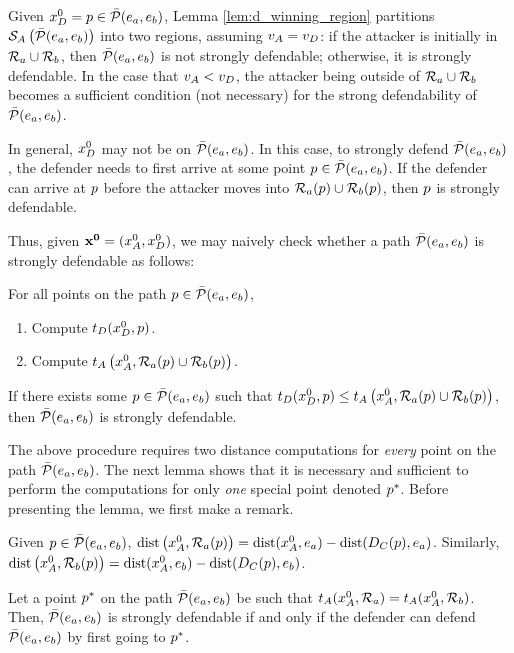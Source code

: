 Given $x_D^0=p\in\bar{\mathcal{P}}(e_a,e_b)$, Lemma \ref{lem:d_winning_region} partitions $\mathcal{S}_A\left(\bar{\mathcal{P}}(e_a,e_b)\right)$ into two regions, assuming $v_A=v_D$: if the attacker is initially in $\mathcal{R}_a \cup \mathcal{R}_b$, then $\bar{\mathcal{P}}(e_a,e_b)$ is not strongly defendable; otherwise, it is strongly defendable. In the case that $v_A<v_D$, the attacker being outside of $\mathcal{R}_a \cup \mathcal{R}_b$ becomes a sufficient condition (not necessary) for the strong defendability of $\bar{\mathcal{P}}(e_a,e_b)$.

In general, $x_D^0$ may not be on $\bar{\mathcal{P}}(e_a,e_b)$. In this case, to strongly defend $\bar{\mathcal{P}}(e_a,e_b)$, the defender needs to first arrive at some point $p\in\bar{\mathcal{P}}(e_a,e_b)$. If the defender can arrive at $p$ before the attacker moves into $\mathcal{R}_a(p)\cup\mathcal{R}_b(p)$, then $p$ is strongly defendable. 

Thus, given $\mathbf{x^0} = (x_A^0,x_D^0)$, we may naively check whether a path $\bar{\mathcal{P}}(e_a,e_b)$ is strongly defendable as follows:

For all points on the path $p\in\bar{\mathcal{P}}(e_a,e_b)$,
\begin{enumerate}
\item Compute $t_D(x_D^0, p)$.
\item Compute $t_A\left(x_A^0,\mathcal{R}_a(p)\cup\mathcal{R}_b(p)\right)$.
\end{enumerate}
If there exists some $p\in\bar{\mathcal{P}}(e_a,e_b)$ such that $t_D(x_D^0, p)\le t_A\left(x_A^0,\mathcal{R}_a(p)\cup\mathcal{R}_b(p)\right)$, then $\bar{\mathcal{P}}(e_a,e_b)$ is strongly defendable. 

The above procedure requires two distance computations for \textit{every} point on the path $\bar{\mathcal{P}}(e_a,e_b)$. The next lemma shows that it is necessary and sufficient to perform the computations for only \textit{one} special point denoted $p^*$. Before presenting the lemma, we first make a remark.

\begin{rem} \label{rem:time_to_region_a}
Given $p\in\bar{\mathcal{P}}(e_a,e_b)$, $\text{dist}\left(x_A^0,\mathcal{R}_a(p)\right) = \text{dist}(x_A^0,e_a) - \text{dist}(D_C(p),e_a)$. Similarly, $\text{dist}\left(x_A^0,\mathcal{R}_b(p)\right) = \text{dist}(x_A^0,e_b) - \text{dist}(D_C(p),e_b)$.
\end{rem}

\begin{lem} \label{lem:pstar}
Let a point $p^*$ on the path $\bar{\mathcal{P}}(e_a,e_b)$ be such that $t_A(x_A^0,\mathcal{R}_a)=t_A(x_A^0,\mathcal{R}_b)$. Then, $\bar{\mathcal{P}}(e_a,e_b)$ is strongly defendable if and only if the defender can defend $\bar{\mathcal{P}}(e_a,e_b)$ by first going to $p^*$.
\end{lem}

